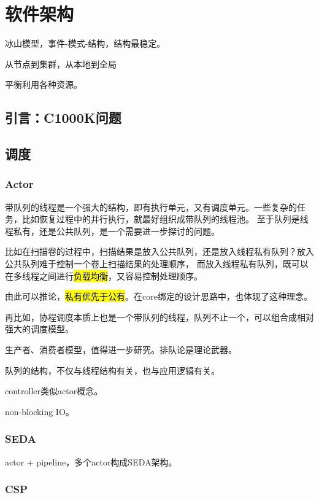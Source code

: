 \chapter{软件架构}

冰山模型，事件-模式-结构，结构最稳定。

从节点到集群，从本地到全局

平衡利用各种资源。

\section{引言：C1000K问题}

\section{调度}

\subsection{Actor}

带队列的线程是一个强大的结构，即有执行单元，又有调度单元。一些复杂的任务，比如恢复过程中的并行执行，就最好组织成带队列的线程池。
至于队列是线程私有，还是公共队列，是一个需要进一步探讨的问题。

比如在扫描卷的过程中，扫描结果是放入公共队列，还是放入线程私有队列？放入公共队列难于控制一个卷上扫描结果的处理顺序，
而放入线程私有队列，既可以在多线程之间进行\hl{负载均衡}，又容易控制处理顺序。

由此可以推论，\hl{私有优先于公有}。在core绑定的设计思路中，也体现了这种理念。

再比如，协程调度本质上也是一个带队列的线程，队列不止一个，可以组合成相对强大的调度模型。

生产者、消费者模型，值得进一步研究。排队论是理论武器。

队列的结构，不仅与线程结构有关，也与应用逻辑有关。

controller类似actor概念。

non-blocking IO。

\subsection{SEDA}

actor + pipeline，多个actor构成SEDA架构。

\subsection{CSP}


